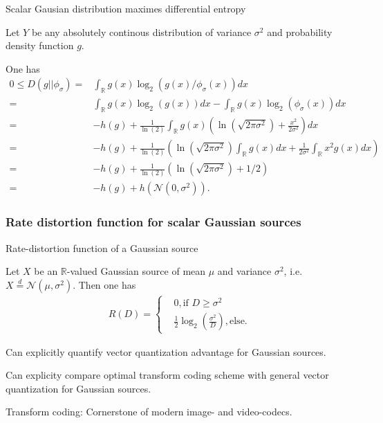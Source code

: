 \begin{frame}{Scalar Gausian distribution maximes differential entropy}
\bit
\item Let $Y$ be any absolutely continous distribution of variance $\sigma^2$ and probability density function $g$.
\item One has 
\begin{align*}
0\leq D(g||\phi_\sigma)=&\int_{\mathbb{R}}g(x)\log_2\left(g(x)/\phi_\sigma(x)\right)dx\\
=&\int_{\mathbb{R}}g(x)\log_2(g(x))dx-\int_{\mathbb{R}}g(x)\log_2(\phi_\sigma(x))dx\\
=&-h(g)+\frac{1}{\ln(2)}\int_{\mathbb{R}}g(x)\left(\ln(\sqrt{2\pi\sigma^2})+\frac{x^2}{2\sigma^2}\right)dx\\
=&-h(g)+\frac{1}{\ln(2)}(\ln(\sqrt{2\pi\sigma^2})\int_{\mathbb{R}}g(x)dx+\frac{1}{2\sigma^2}\int_{\mathbb{R}}x^2g(x)dx)\\
=&-h(g)+\frac{1}{\ln(2)}(\ln(\sqrt{2\pi\sigma^2})+1/2)\\
=&-h(g)+h(\mathcal{N}(0,\sigma^2)).
\end{align*}
\eit
\end{frame}

\subsubsection{Rate distortion function for scalar Gaussian sources}
\begin{frame}{Rate-distortion function of a Gaussian source}
\begin{theorem}
Let $X$ be an $\mathbb{R}$-valued Gaussian source of mean $\mu$ and variance $\sigma^2$, i.e. $X\stackrel{d}{=} \mathcal{N}(\mu,\sigma^2)$. Then one has 
\begin{align}\label{RDGauss}
R(D)=\begin{cases} &0, \text{if $D\geq \sigma^2$} \\ &\frac{1}{2}\log_2\left(\frac{\sigma^2}{D}\right), \text{else.} \end{cases}
\end{align}
\end{theorem}
\bit
\item [\iarrow] 
\eit
\vspace{-0.2cm}
\bit
\item Can explicitly quantify vector quantization advantage for Gaussian sources.
\item Can explicity compare optimal transform coding 
scheme with general vector quantization for Gaussian sources. 
\item Transform coding: Cornerstone of modern image- and video-codecs.
 \eit
\end{frame}

